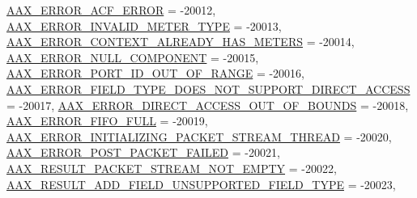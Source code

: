 \begin{DoxyCompactItemize}
\newline
\mbox{\hyperlink{a00494_a5f8c7439f3a706c4f8315a9609811937a849098e78783b5d82562b27b95a14777}{A\+A\+X\+\_\+\+E\+R\+R\+O\+R\+\_\+\+A\+C\+F\+\_\+\+E\+R\+R\+OR}} = -\/20012, 
\mbox{\hyperlink{a00494_a5f8c7439f3a706c4f8315a9609811937ae0c64c5bc8555e28c8b1292797751bf2}{A\+A\+X\+\_\+\+E\+R\+R\+O\+R\+\_\+\+I\+N\+V\+A\+L\+I\+D\+\_\+\+M\+E\+T\+E\+R\+\_\+\+T\+Y\+PE}} = -\/20013, 
\mbox{\hyperlink{a00494_a5f8c7439f3a706c4f8315a9609811937a05d8b2e9843c1e3b46beec5ed384428a}{A\+A\+X\+\_\+\+E\+R\+R\+O\+R\+\_\+\+C\+O\+N\+T\+E\+X\+T\+\_\+\+A\+L\+R\+E\+A\+D\+Y\+\_\+\+H\+A\+S\+\_\+\+M\+E\+T\+E\+RS}} = -\/20014, 
\mbox{\hyperlink{a00494_a5f8c7439f3a706c4f8315a9609811937a68d2d3b24eab398fa95b64b87590995f}{A\+A\+X\+\_\+\+E\+R\+R\+O\+R\+\_\+\+N\+U\+L\+L\+\_\+\+C\+O\+M\+P\+O\+N\+E\+NT}} = -\/20015, 
\newline
\mbox{\hyperlink{a00494_a5f8c7439f3a706c4f8315a9609811937a288a89626f746bb5fe73d1e64afe495c}{A\+A\+X\+\_\+\+E\+R\+R\+O\+R\+\_\+\+P\+O\+R\+T\+\_\+\+I\+D\+\_\+\+O\+U\+T\+\_\+\+O\+F\+\_\+\+R\+A\+N\+GE}} = -\/20016, 
\mbox{\hyperlink{a00494_a5f8c7439f3a706c4f8315a9609811937aa3ee2974297fb823956900fd6294975d}{A\+A\+X\+\_\+\+E\+R\+R\+O\+R\+\_\+\+F\+I\+E\+L\+D\+\_\+\+T\+Y\+P\+E\+\_\+\+D\+O\+E\+S\+\_\+\+N\+O\+T\+\_\+\+S\+U\+P\+P\+O\+R\+T\+\_\+\+D\+I\+R\+E\+C\+T\+\_\+\+A\+C\+C\+E\+SS}} = -\/20017, 
\mbox{\hyperlink{a00494_a5f8c7439f3a706c4f8315a9609811937a551ea12047b22ba001765454b103a779}{A\+A\+X\+\_\+\+E\+R\+R\+O\+R\+\_\+\+D\+I\+R\+E\+C\+T\+\_\+\+A\+C\+C\+E\+S\+S\+\_\+\+O\+U\+T\+\_\+\+O\+F\+\_\+\+B\+O\+U\+N\+DS}} = -\/20018, 
\mbox{\hyperlink{a00494_a5f8c7439f3a706c4f8315a9609811937a645af19cfe6722009b826f78fda4517c}{A\+A\+X\+\_\+\+E\+R\+R\+O\+R\+\_\+\+F\+I\+F\+O\+\_\+\+F\+U\+LL}} = -\/20019, 
\newline
\mbox{\hyperlink{a00494_a5f8c7439f3a706c4f8315a9609811937ad7177dc54f7d14ee9acc3a965664fc01}{A\+A\+X\+\_\+\+E\+R\+R\+O\+R\+\_\+\+I\+N\+I\+T\+I\+A\+L\+I\+Z\+I\+N\+G\+\_\+\+P\+A\+C\+K\+E\+T\+\_\+\+S\+T\+R\+E\+A\+M\+\_\+\+T\+H\+R\+E\+AD}} = -\/20020, 
\mbox{\hyperlink{a00494_a5f8c7439f3a706c4f8315a9609811937a9230db9af40b4401d17d2f597e75adca}{A\+A\+X\+\_\+\+E\+R\+R\+O\+R\+\_\+\+P\+O\+S\+T\+\_\+\+P\+A\+C\+K\+E\+T\+\_\+\+F\+A\+I\+L\+ED}} = -\/20021, 
\mbox{\hyperlink{a00494_a5f8c7439f3a706c4f8315a9609811937a400d9332b820436d544b658523dacbf0}{A\+A\+X\+\_\+\+R\+E\+S\+U\+L\+T\+\_\+\+P\+A\+C\+K\+E\+T\+\_\+\+S\+T\+R\+E\+A\+M\+\_\+\+N\+O\+T\+\_\+\+E\+M\+P\+TY}} = -\/20022, 
\mbox{\hyperlink{a00494_a5f8c7439f3a706c4f8315a9609811937a3820695c507c18cef39a7cf8972e468b}{A\+A\+X\+\_\+\+R\+E\+S\+U\+L\+T\+\_\+\+A\+D\+D\+\_\+\+F\+I\+E\+L\+D\+\_\+\+U\+N\+S\+U\+P\+P\+O\+R\+T\+E\+D\+\_\+\+F\+I\+E\+L\+D\+\_\+\+T\+Y\+PE}} = -\/20023, 

\end{DoxyCompactItemize}
